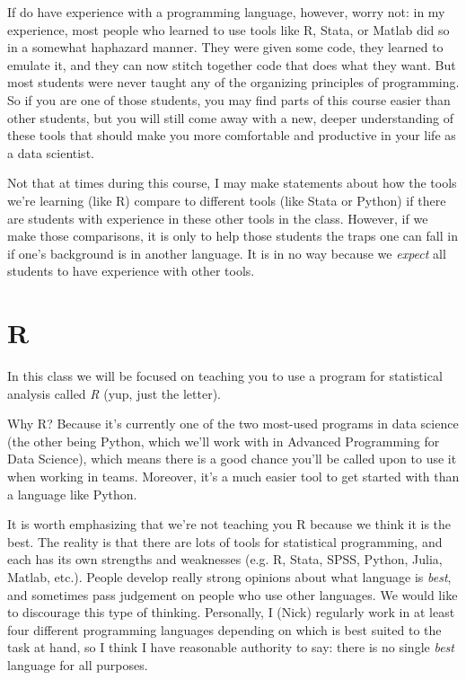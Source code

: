 \documentclass[12pt]{article}
\begin{document}
If do have experience with a programming language, however, worry not: in my experience, most people who learned to use tools like R, Stata, or Matlab did so in a somewhat haphazard manner. They were given some code, they learned to emulate it, and they can now stitch together code that does what they want. But most students were never taught any of the organizing principles of programming. So if you are one of those students, you may find parts of this course easier than other students, but you will still come away with a new, deeper understanding of these tools that should make you more comfortable and productive in your life as a data scientist.

Not that at times during this course, I may make statements about how the tools we're learning (like R) compare to different tools (like Stata or Python) if there are students with experience in these other tools in the class. However, if we make those comparisons, it is only to help those students the traps one can fall in if one's background is in another language. It is in no way because we \emph{expect} all students to have experience with other tools.

\section{R}

In this class we will be focused on teaching you to use a program for statistical analysis called \emph{R} (yup, just the letter).

Why R? Because it's currently one of the two most-used programs in data science (the other being Python, which we'll work with in Advanced Programming for Data Science), which means there is a good chance you'll be called upon to use it when working in teams. Moreover, it's a much easier tool to get started with than a language like Python.

It is worth emphasizing that we're not teaching you R because we think it is the best. The reality is that there are lots of tools for statistical programming, and each has its own strengths and weaknesses (e.g. R, Stata, SPSS, Python, Julia, Matlab, etc.). People develop really strong opinions about what language is \emph{best}, and sometimes pass judgement on people who use other languages. We would like to discourage this type of thinking. Personally, I (Nick) regularly work in at least four different programming languages depending on which is best suited to the task at hand, so I think I have reasonable authority to say: there is no single \emph{best} language for all purposes.
\end{document}
